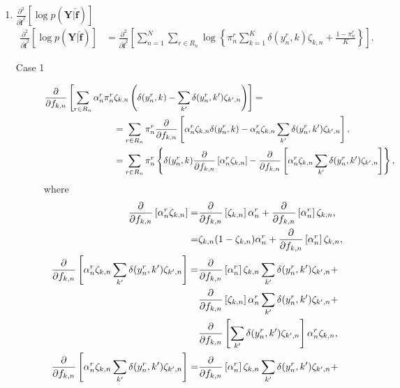 \documentclass[9pt]{article}
\providecommand{\ve}[1]{{\bm{#1}}}%
\providecommand{\mat}[1]{{\bm{#1}}} %
\providecommand{\ve}[1]{{\mathbf{#1}}}
\providecommand{\mat}[1]{{\mathbf{#1}}}
\newcommand{\fracpartial}[2]{\frac{\partial #1}{\partial  #2}} %
\begin{document}
\begin{enumerate}
	\item $\fracpartial{^2}{\hat{\ve{f}}^2}\left[\log p(\mat{Y}|\hat{\ve{f}})\right]$
	\begin{align}
	\fracpartial{^2}{\hat{\ve{f}}^2}\left[\log p(\mat{Y}|\hat{\ve{f}})\right]&= \fracpartial{^2}{\hat{\ve{f}}^2}\left[\sum^N_{n=1}\sum_{r\in R_n}\log\left\{\pi_n^r\sum_{k=1}^{K}\delta(y_n^r,k)\zeta_{k,n} + \frac{1-\pi_n^r}{K}  \right\}\right].
	\end{align}
	\begin{description}
		\item[Case 1]
		\begin{align}
		\notag\fracpartial{}{f_{k,n}}\left[\sum_{r\in R_n}\alpha_n^r\pi_n^r\zeta_{k,n}\left(\delta(y_n^r,k)-\sum_{k^{\prime}}\delta(y_n^r,k^{\prime})\zeta_{k^{\prime},n}\right)\right] &=\\
		&\hspace{-5.5cm}=\sum_{r\in R_n}\pi_n^r \fracpartial{}{f_{k,n}}\left[\alpha_n^r\zeta_{k,n}\delta(y_n^r,k) - \alpha_n^r\zeta_{k,n}\sum_{k^{\prime}}\delta(y_n^r,k^{\prime})\zeta_{k^{\prime},n}\right],\\
		&\hspace{-5.5cm}=\sum_{r\in R_n}\pi_n^r\left\{\delta(y_n^r,k)\fracpartial{}{f_{k,n}}\left[\alpha_n^r\zeta_{k,n}\right] - \fracpartial{}{f_{k,n}}\left[\alpha_n^r\zeta_{k,n}\sum_{k^{\prime}}\delta(y_n^r,k^{\prime})\zeta_{k^{\prime},n}\right]\right\},
		\end{align}
		where
		\begin{align}
		\notag\fracpartial{}{f_{k,n}}\left[\alpha_n^r\zeta_{k,n}\right] =& \fracpartial{}{f_{k,n}}\left[\zeta_{k,n}\right]\alpha_n^r + \fracpartial{}{f_{k,n}}\left[\alpha_n^r\right]\zeta_{k,n},\\
		=& \zeta_{k,n}(1-\zeta_{k,n})\alpha_n^r + \fracpartial{}{f_{k,n}}\left[\alpha_n^r\right]\zeta_{k,n},\\
		\notag\fracpartial{}{f_{k,n}}\left[\alpha_n^r\zeta_{k,n}\sum_{k^{\prime}}\delta(y_n^r,k^{\prime})\zeta_{k^{\prime},n}\right] =& \fracpartial{}{f_{k,n}}\left[\alpha_n^r\right]\zeta_{k,n}\sum_{k^{\prime}}\delta(y_n^r,k^{\prime})\zeta_{k^{\prime},n} + \\
		\notag&\fracpartial{}{f_{k,n}}\left[\zeta_{k,n}\right]\alpha_n^r\sum_{k^{\prime}}\delta(y_n^r,k^{\prime})\zeta_{k^{\prime},n} +\\
		\notag&\fracpartial{}{f_{k,n}}\left[\sum_{k^{\prime}}\delta(y_n^r,k^{\prime})\zeta_{k^{\prime},n}\right]\alpha_n^r\zeta_{k,n},\\
		\notag \fracpartial{}{f_{k,n}}\left[\alpha_n^r\zeta_{k,n}\sum_{k^{\prime}}\delta(y_n^r,k^{\prime})\zeta_{k^{\prime},n}\right]=& \fracpartial{}{f_{k,n}}\left[\alpha_n^r\right]\zeta_{k,n}\sum_{k^{\prime}}\delta(y_n^r,k^{\prime})\zeta_{k^{\prime},n} + \\

\end{align}
\end{description}
\end{enumerate}
\end{document}

